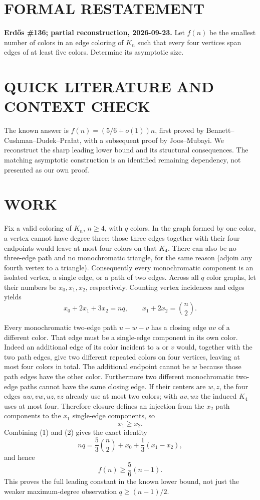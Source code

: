 \section{FORMAL RESTATEMENT}
\textbf{Erd\H{o}s \#136; partial reconstruction, 2026-09-23.}
Let $f(n)$ be the smallest number of colors in an edge coloring of
$K_n$ such that every four vertices span edges of at least five colors.
Determine its asymptotic size.

\section{QUICK LITERATURE AND CONTEXT CHECK}
The known answer is $f(n)=(5/6+o(1))n$, first proved by
Bennett--Cushman--Dudek--Pra\l at, with a subsequent proof by Joos--Mubayi.
We reconstruct the sharp leading lower bound and its structural
consequences. The matching asymptotic construction is an identified
remaining dependency, not presented as our own proof.

\section{WORK}
Fix a valid coloring of $K_n$, $n\ge4$, with $q$ colors. In the graph
formed by one color, a vertex cannot have degree three: those three
edges together with their four endpoints would leave at most four
colors on that $K_4$. There can also be no three-edge path and no
monochromatic triangle, for the same reason (adjoin any fourth vertex
to a triangle). Consequently every monochromatic component is an
isolated vertex, a single edge, or a path of two edges.
Across all $q$ color graphs, let their numbers be $x_0,x_1,x_2$,
respectively. Counting vertex incidences and edges yields
\[
 x_0+2x_1+3x_2=nq,\qquad x_1+2x_2=\binom n2.             \tag{1}
\]

Every monochromatic two-edge path $u-w-v$ has a closing edge $uv$
of a different color. That edge must be a single-edge component in its
own color. Indeed an additional edge of its color incident to $u$ or
$v$ would, together with the two path edges, give two different
repeated colors on four vertices, leaving at most four colors in total.
The additional endpoint cannot be $w$ because those path edges have
the other color.
Furthermore two different monochromatic two-edge paths cannot have
the same closing edge. If their centers are $w,z$, the four edges
$uw,vw,uz,vz$ already use at most two colors; with $uv,wz$ the induced
$K_4$ uses at most four. Therefore closure defines an injection from
the $x_2$ path components to the $x_1$ single-edge components, so
\[
 x_1\ge x_2.                                             \tag{2}
\]
Combining (1) and (2) gives the exact identity
\[
 nq=\frac53\binom n2+x_0+\frac13(x_1-x_2),
\]
and hence
\[
 f(n)\ge\frac56(n-1).                                   \tag{3}
\]
This proves the full leading constant in the known lower bound, not
just the weaker maximum-degree observation $q\ge(n-1)/2$.

